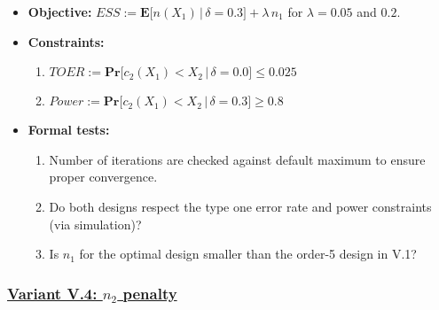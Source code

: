 \documentclass[
]{book}
\providecommand{\tightlist}{%
  \setlength{\itemsep}{0pt}\setlength{\parskip}{0pt}}
\begin{document}
\begin{itemize}
\tightlist
\item
  \textbf{Objective:} \(ESS := \boldsymbol{E}\big[n(X_1)\,|\,\delta=0.3\big] + \lambda \, n_1\)
  for \(\lambda = 0.05\) and \(0.2\).
\item
  \textbf{Constraints:}

  \begin{enumerate}
  \def\labelenumi{\arabic{enumi}.}
  \tightlist
  \item
    \(TOER := \boldsymbol{Pr}\big[c_2(X_1) < X_2\,|\,\delta=0.0\big] \leq 0.025\)
  \item
    \(Power := \boldsymbol{Pr}\big[c_2(X_1) < X_2\,|\,\delta=0.3\big] \geq 0.8\)
  \end{enumerate}
\item
  \textbf{Formal tests:}

  \begin{enumerate}
  \def\labelenumi{\arabic{enumi}.}
  \tightlist
  \item
    Number of iterations are checked against default maximum to ensure proper
    convergence.
  \item
    Do both designs respect the type one error rate
    and power constraints (via simulation)?
  \item
    Is \(n_1\) for the optimal design smaller than the order-5 design in V.1?
  \end{enumerate}
\end{itemize}

\hypertarget{variant-v.4-n_2-penalty}{%
\subsubsection{\texorpdfstring{\protect\hyperlink{variantV_4}{Variant V.4: \(n_2\) penalty}}{Variant V.4: n\_2 penalty}}\label{variant-v.4-n_2-penalty}}
\end{document}
